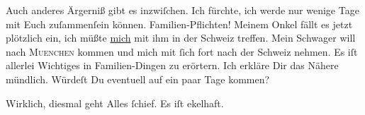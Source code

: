 \pstart
           Auch anderes Ärgerniß gibt es inzwiſchen. Ich fürchte, ich werde nur wenige Tage mit
               Euch zuſammenſein können. Familien-Pflichten! Meinem Onkel fällt es jetzt plötzlich ein, ich
               müßte \uline{mich} mit ihm in der Schweiz treffen. Mein Schwager will nach \textsc{Muenchen} kommen und mich mit ſich fort nach der {\pb}Schweiz nehmen. Es iſt allerlei Wichtiges in
               Familien-Dingen zu erörtern. Ich erkläre Dir das Nähere mündlich. Würdeſt Du
               eventuell auf ein paar Tage \label{K_L02746-4v}\label{K_L02746-4} kommen?\pend
           
\pstart
           Wirklich, diesmal geht Alles ſchief. Es iſt ekelhaft.\pend
           
